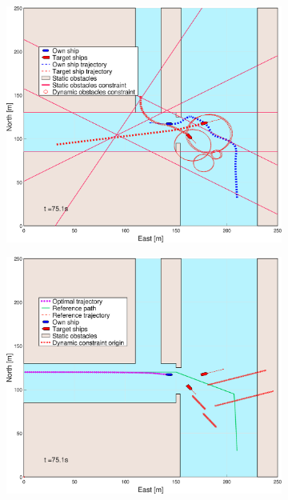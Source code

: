 \begin{figure}[ht]\ContinuedFloat
    \begin{subfigure}[b]{0.494\textwidth}
        \centering
        \includegraphics[width=\textwidth]{Images/Figures/Havn1/_Simple_1fig1_time=75}
        \subcaption{}
    \end{subfigure}
    \hfill
    \begin{subfigure}[b]{0.494\textwidth}
        \centering
        \includegraphics[width=\textwidth]{Images/Figures/Havn1/_Simple_1fig999_time=75}

\end{subfigure}
\end{figure}
